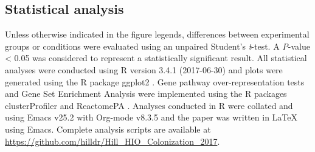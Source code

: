 \documentclass[9pt,lineo]{elife}
\begin{document}
\subsection*{{\bfseries\sffamily } Statistical analysis}
\label{sec:orgheadline26}
Unless otherwise indicated in the figure legends, differences between experimental groups or conditions were evaluated using an unpaired Student's \emph{t}-test. A \emph{P}-value < 0.05 was considered to represent a statistically significant result. All statistical analyses were conducted using R version 3.4.1 (2017-06-30) \citep{CRAN:2017} and plots were generated using the R package ggplot2 \citep{Wickham:2009}. Gene pathway over-representation tests and Gene Set Enrichment Analysis \citep{Subramanian:2005} were implemented using the R packages clusterProfiler \citep{Yu:2012} and ReactomePA \citep{Yu:2016}. Analyses conducted in R were collated and using Emacs v25.2 \citep{Stallman:1981:EEC:1159890.806466} with Org-mode v8.3.5 and the paper was written in \LaTeX{} using Emacs. Complete analysis scripts are available at \url{https://github.com/hilldr/Hill_HIO_Colonization_2017}.
\end{document}
